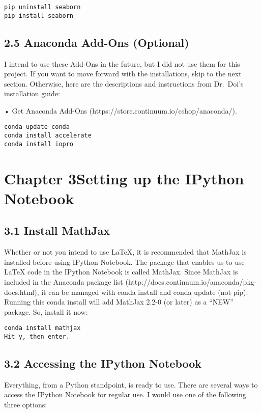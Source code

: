\documentclass{article}
\begin{document}
\begin{verbatim}
pip uninstall seaborn
pip install seaborn
\end{verbatim}


    \subsection{2.5 Anaconda Add-Ons (Optional)}


    I intend to use these Add-Ons in the future, but I did not use them for
this project. If you want to move forward with the installations, skip
to the next section. Otherwise, here are the descriptions and
instructions from Dr.~Doi's installation guide:

• Get Anaconda Add-Ons (https://store.continuum.io/cshop/anaconda/).

\begin{verbatim}
conda update conda
conda install accelerate
conda install iopro
\end{verbatim}


    \section{Chapter 3Setting up the IPython Notebook}



    \subsection{3.1 Install MathJax}


    Whether or not you intend to use LaTeX, it is recommended that MathJax
is installed before using IPython Notebook. The package that enables us
to use LaTeX code in the IPython Notebook is called MathJax. Since
MathJax is included in the Anaconda package list
(http://docs.continuum.io/anaconda/pkg-docs.html), it can be managed
with conda install and conda update (not pip). Running this conda
install will add MathJax 2.2-0 (or later) as a ``NEW'' package. So,
install it now:

\begin{verbatim}
conda install mathjax
Hit y, then enter.
\end{verbatim}


    \subsection{3.2 Accessing the IPython Notebook}


    Everything, from a Python standpoint, is ready to use. There are several
ways to access the IPython Notebook for regular use. I would use one of
the following three options:
\end{document}
